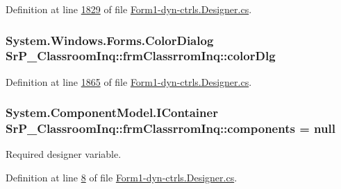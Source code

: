 \-Definition at line \hyperlink{_form1-dyn-ctrls_8_designer_8cs_source_l01829}{1829} of file \hyperlink{_form1-dyn-ctrls_8_designer_8cs_source}{\-Form1-\/dyn-\/ctrls.\-Designer.\-cs}.

\hypertarget{class_sr_p___classroom_inq_1_1frm_classrrom_inq_afb408ee0fe102fbf3df36e551ec24d4c}{
\subsubsection[{color\-Dlg}]{\setlength{\rightskip}{0pt plus 5cm}\-System.\-Windows.\-Forms.\-Color\-Dialog {\bf \-Sr\-P\-\_\-\-Classroom\-Inq\-::frm\-Classrrom\-Inq\-::color\-Dlg}}}
\label{class_sr_p___classroom_inq_1_1frm_classrrom_inq_afb408ee0fe102fbf3df36e551ec24d4c}


\-Definition at line \hyperlink{_form1-dyn-ctrls_8_designer_8cs_source_l01865}{1865} of file \hyperlink{_form1-dyn-ctrls_8_designer_8cs_source}{\-Form1-\/dyn-\/ctrls.\-Designer.\-cs}.

\hypertarget{class_sr_p___classroom_inq_1_1frm_classrrom_inq_a9ae295b3d0621cd5e50bcf8a475c0686}{
\subsubsection[{components}]{\setlength{\rightskip}{0pt plus 5cm}\-System.\-Component\-Model.\-I\-Container {\bf \-Sr\-P\-\_\-\-Classroom\-Inq\-::frm\-Classrrom\-Inq\-::components} = null}}
\label{class_sr_p___classroom_inq_1_1frm_classrrom_inq_a9ae295b3d0621cd5e50bcf8a475c0686}


\-Required designer variable. 



\-Definition at line \hyperlink{_form1-dyn-ctrls_8_designer_8cs_source_l00008}{8} of file \hyperlink{_form1-dyn-ctrls_8_designer_8cs_source}{\-Form1-\/dyn-\/ctrls.\-Designer.\-cs}.

